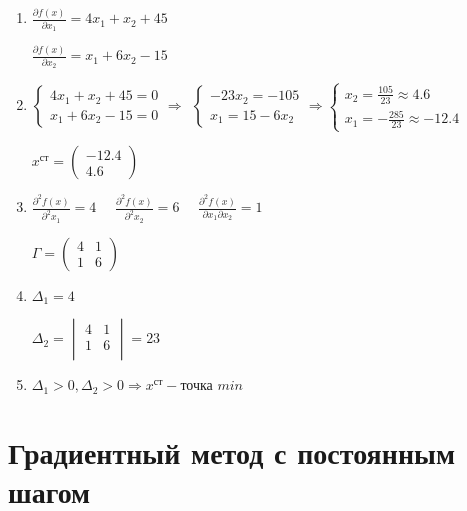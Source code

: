 \documentclass{article}
\begin{document}
\begin{enumerate}
    \setcounter{enumi}{0}
    \item 
        $\frac{\partial f(x)}{\partial x_1} = 4x_1 + x_2 + 45$
    
        $\frac{\partial f(x)}{\partial x_2} = x_1 + 6x_2 - 15$
    \item
        $\begin{cases}
            4x_1 + x_2 + 45 = 0 \\
            x_1 + 6x_2 - 15 = 0
        \end{cases}
        \Longrightarrow \ \ 
        \begin{cases}
            -23x_2 = -105 \\
            x_1 = 15 - 6x_2
        \end{cases}
        \Longrightarrow
        \begin{cases}
            x_2 = \frac{105}{23} \approx 4.6 \\
            x_1 = - \frac{285}{23} \approx -12.4
        \end{cases}$ 
        
        $x^{ст} = \begin{pmatrix}
             -12.4  \\
             4.6 
        \end{pmatrix}$
    \item
        $\frac{\partial^2 f(x)}{\partial^2 x_1} = 4$ \ \ 
        $\frac{\partial^2 f(x)}{\partial^2 x_2} = 6$ \ \ 
        $\frac{\partial^2 f(x)}{\partial x_1 \partial x_2} = 1$
        
        $\Gamma = 
        \begin{pmatrix}
            4& 1 \\
            1& 6
        \end{pmatrix}
        $
    \item
        $\Delta_1 = 4$
        
        $\Delta_2 = 
        \begin{vmatrix}
            4 & 1 \\
            1 & 6 \\
        \end{vmatrix} = 23$
    \item
        $\Delta_1 > 0, \Delta_2 > 0 \Rightarrow x^{ст} - \text{точка } min$
\end{enumerate}

\pagebreak

\section{Градиентный метод с постоянным шагом}
\end{document}
